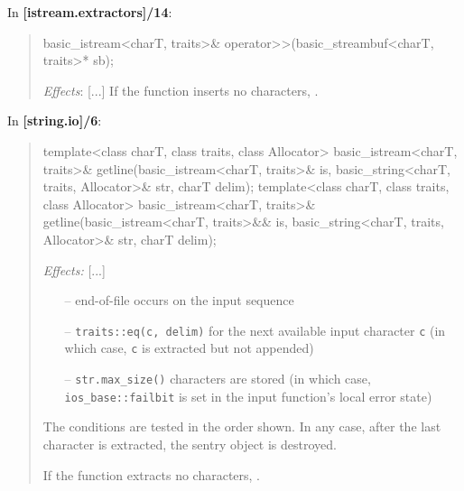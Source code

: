 \documentclass{wg21}
\begin{document}
In \textbf{[istream.extractors]/14}:
\begin{quote}
\begin{codeblock}
basic_istream<charT, traits>& operator>>(basic_streambuf<charT, traits>* sb);
\end{codeblock}
\textit{Effects}: [...]
If the function inserts no characters, .
\end{quote}

In \textbf{[string.io]/6}:
\begin{quote}
\begin{codeblock}
template<class charT, class traits, class Allocator>
basic_istream<charT, traits>&
  getline(basic_istream<charT, traits>& is,
          basic_string<charT, traits, Allocator>& str,
          charT delim);
template<class charT, class traits, class Allocator>
basic_istream<charT, traits>&
  getline(basic_istream<charT, traits>&& is,
          basic_string<charT, traits, Allocator>& str,
          charT delim);
\end{codeblock}
\textit{Effects:} [...]
\begin{itemize}
  \item[--] end-of-file occurs on the input sequence\added{;}
  \item[--] \texttt{traits::eq(c, delim)} for the next available input character
            \texttt{c} (in which case, \texttt{c} is extracted but not appended)
  \item[--] \texttt{str.max_size()} characters are stored (in which case,
            {\texttt{ios_base::failbit} is set in the input function's local error state})
\end{itemize}
The conditions are tested in the order shown. In any case, after the last
character is extracted, the sentry object is destroyed.

If the function extracts no characters, .
\end{quote}
\end{document}

